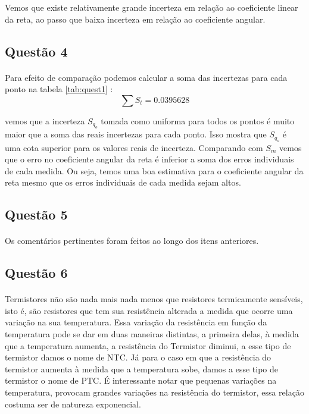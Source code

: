 \documentclass[a4paper,11pt]{article}
\begin{document}
Vemos que existe relativamente grande incerteza em relação ao coeficiente
linear da reta, ao passo que baixa incerteza em relação ao coeficiente angular.


\subsection{Questão 4}
\paragraph{} Para efeito de comparação podemos calcular a soma das incertezas para cada ponto na tabela
\ref{tab:quest1} : 
	\begin{equation}
		\sum S_t = 0.0395628
	\end{equation}
	
	vemos que a incerteza $S_{q_o}$ tomada como uniforma para todos os pontos é muito maior que a
	soma das reais incertezas para cada ponto. Isso mostra que $S_{q_o}$ é uma cota superior para os
	valores reais de incerteza. Comparando com $S_m$ vemos que o erro no coeficiente angular da reta
	é inferior a soma dos erros individuais de cada medida. Ou seja, temos uma boa estimativa para
	o coeficiente angular da reta mesmo que os erros individuais de cada medida sejam altos.
\subsection{Questão 5}
\paragraph{} Os comentários pertinentes foram feitos ao longo dos itens anteriores.

\subsection{Questão 6}
	\paragraph{} Termistores não são nada mais nada menos que resistores termicamente sensíveis, isto é, são resistores que tem sua resistência alterada a medida que ocorre uma variação na sua temperatura. Essa variação da resistência em função da temperatura pode se dar em duas maneiras distintas, a primeira delas, à medida que a temperatura aumenta, a resistência do Termistor diminui, a esse tipo de termistor damos o nome de NTC. Já para o caso em que a resistência do termistor aumenta à medida que a temperatura sobe, damos a esse tipo de termistor o nome de PTC. É interessante notar que pequenas variações na temperatura, provocam grandes variações na resistência do termistor, essa relação costuma ser de natureza exponencial.
\end{document}
